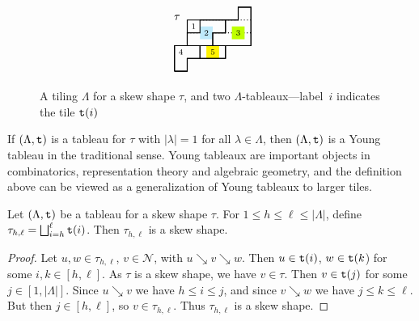 \documentclass[Unicode,ALCO]{cedram}
\newcommand{\N}{\mathcal{N}}
\newcommand{\0}{{\bar 0}}
\newcommand{\ttt}{{\tt t}}
\begin{document}
\begin{figure}
\begin{align*}
{\begin{tikzpicture}[scale=0.4]
\draw[thick, dotted] (1,2)--(6,2);
\draw[thick, dotted] (2,3)--(6,3);
\node at (1.5,2.5){ $\scriptstyle 1$};
\node at (0.5,0.5){ $\scriptstyle4$};
\fill[fill=cyan!25] (2,1.5)--(3,1.5)--(3,2.5)--(2,2.5)--(2,0);
\node at (2.5,2){ $\scriptstyle2$};
\fill[fill=lime] (4.5,1.5)--(5.5,1.5)--(5.5,2.5)--(4.5,2.5)--(4.5,1.5);
\node at (5,2){ $\scriptstyle3$};
\fill[fill=yellow] (2.5,0)--(3.5,0)--(3.5,1)--(2.5,1)--(2.5,0);
\node at (3,0.5){ $\scriptstyle5$};
\node at (0.2,3.2){ $\tau$};
\draw[thick]   (0,-1)--(1,-1)--(1,0)--(4,0)--(4,1)--(6,1)--(6,4)--(5,4)--(5,3)--(1,3)--(1,2)--(1,1)--(0,1)--(0,-1);
\draw[thick]  (0,-1)--(1,-1)--(1,0)--(2,0)--(2,1)--(1,1)--(0,1)--(0,-1);
\draw[thick] (2,0)--(4,0)--(4,1)--(2,1)--(2,0);
\draw[thick] (3,1)--(6,1)--(6,4)--(5,4)--(5,3)--(4,3)--(4,2)--(3,2)--(3,1);
\draw[thick] (1,1)--(3,1)--(3,2)--(4,2)--(4,3)--(2,3)--(2,2)--(1,2)--(1,1);
\end{tikzpicture}
}
\end{align*}
\caption{A tiling \(\Lambda\) for a skew shape \(\tau\), and two \(\Lambda\)-tableaux---label~\(i\) indicates the tile \(\ttt(i)\)}
\label{fig:tilex}       
\end{figure}

\begin{rema}
If \((\Lambda, \ttt)\) is a tableau for \(\tau\) with \(|\lambda| =1\) for all \(\lambda \in \Lambda\), then \((\Lambda, \ttt)\) is a Young tableau in the traditional sense. Young tableaux are important objects in combinatorics, representation theory and algebraic geometry, and the definition above can be viewed as a generalization of Young tableaux to larger tiles.
\end{rema}

\begin{lemma}\label{tabisskew}
Let \((\Lambda, \ttt)\) be a tableau for a skew shape \(\tau\). For \(1 \leq h \leq \ell \leq |\Lambda|\), define \(\tau_{h,\ell} = \bigsqcup_{i = h}^\ell \ttt(i)\). Then \(\tau_{h,\ell}\) is a skew shape.
\end{lemma}
\begin{proof}
Let \(u, w \in \tau_{h,\ell}\), \(v \in \N\), with \(u \searrow v\searrow w\). Then \(u \in \ttt(i)\), \(w \in \ttt(k\)) for some \(i,k \in [h, \ell]\). As \(\tau\) is a skew shape, we have \(v \in \tau\). Then \(v \in \ttt(j)\) for some \(j \in [1, |\Lambda|]\). Since \(u \searrow v\) we have \(h \leq i \leq j\), and since \(v \searrow w\) we have \(j \leq k\leq \ell\). But then \(j \in [h, \ell]\), so \(v \in \tau_{h, \ell}\). Thus \(\tau_{h, \ell}\) is a skew shape.
\end{proof}
\end{document}

